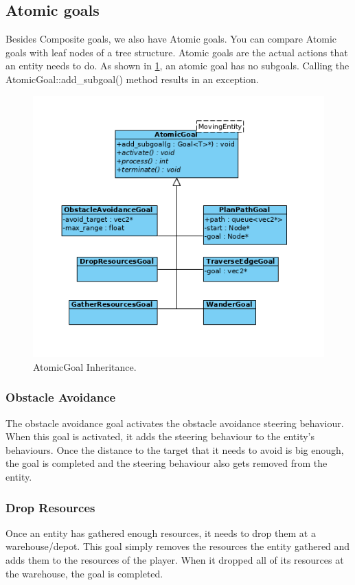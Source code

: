 \subsection{Atomic goals} 
Besides Composite goals, we also have Atomic goals.
You can compare Atomic goals with leaf nodes of a tree structure. Atomic goals
are the actual actions that an entity needs to do. As shown in
\cref{fig:atomicgoal-inherit}, an atomic goal has no subgoals. Calling the
AtomicGoal::add\_subgoal() method results in an exception.
 
\begin{figure}[H] 
    \centering
    \includegraphics[scale=0.75]{res/AtomicGoal-Inherit.jpg} 
    \caption{AtomicGoal Inheritance.}\label{fig:atomicgoal-inherit} 
\end{figure}

\subsubsection{Obstacle Avoidance} 
The obstacle avoidance goal activates the obstacle avoidance steering 
behaviour. When this goal is activated, it adds the steering behaviour to the 
entity's behaviours. Once the distance to the target that it needs to avoid is 
big enough, the goal is completed and the steering behaviour also gets removed 
from the entity.

\subsubsection{Drop Resources} 
\label{sec:dropresources} 
Once an entity has gathered enough resources, it needs to drop them at a 
warehouse/depot. This goal simply removes the resources the entity gathered 
and adds them to the resources of the player. When it dropped all of its 
resources at the warehouse, the goal is completed.


